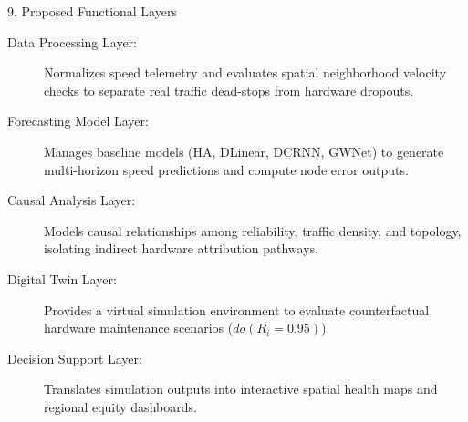\documentclass[aspectratio=169, 10pt]{beamer}
\begin{document}
\begin{frame}{9. Proposed Functional Layers}
  \begin{description}
    \item[Data Processing Layer:] Normalizes speed telemetry and evaluates spatial neighborhood velocity checks to separate real traffic dead-stops from hardware dropouts.
    \item[Forecasting Model Layer:] Manages baseline models (HA, DLinear, DCRNN, GWNet) to generate multi-horizon speed predictions and compute node error outputs.
    \item[Causal Analysis Layer:] Models causal relationships among reliability, traffic density, and topology, isolating indirect hardware attribution pathways.
    \item[Digital Twin Layer:] Provides a virtual simulation environment to evaluate counterfactual hardware maintenance scenarios ($do(R_i = 0.95)$).
    \item[Decision Support Layer:] Translates simulation outputs into interactive spatial health maps and regional equity dashboards.
  \end{description}
\end{frame}
\end{document}
